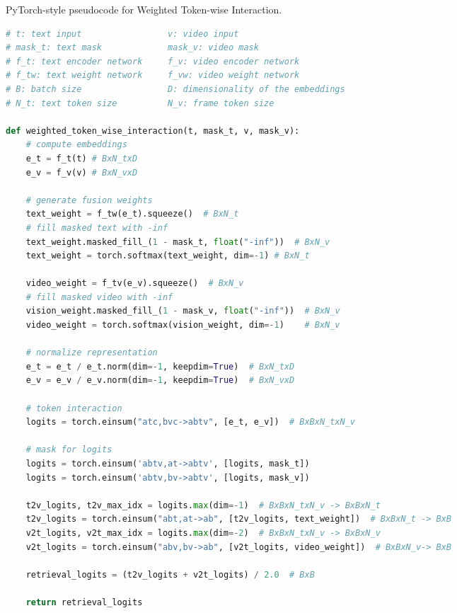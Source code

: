 \documentclass[runningheads]{llncs}
\begin{document}
\begin{algorithm}[tb]
\caption{PyTorch-style pseudocode for Weighted Token-wise Interaction.}
\label{alg:pytorchmask}
   
\begin{lstlisting}[language=python]
# t: text input                 v: video input
# mask_t: text mask             mask_v: video mask
# f_t: text encoder network     f_v: video encoder network
# f_tw: text weight network     f_vw: video weight network
# B: batch size                 D: dimensionality of the embeddings
# N_t: text token size          N_v: frame token size

def weighted_token_wise_interaction(t, mask_t, v, mask_v):    
    # compute embeddings
    e_t = f_t(t) # BxN_txD
    e_v = f_v(v) # BxN_vxD
    
    # generate fusion weights
    text_weight = f_tw(e_t).squeeze()  # BxN_t
    # fill masked text with -inf
    text_weight.masked_fill_(1 - mask_t, float("-inf"))  # BxN_v
    text_weight = torch.softmax(text_weight, dim=-1) # BxN_t
    
    video_weight = f_tv(e_v).squeeze()  # BxN_v
    # fill masked video with -inf
    vision_weight.masked_fill_(1 - mask_v, float("-inf"))  # BxN_v
    video_weight = torch.softmax(vision_weight, dim=-1)    # BxN_v
    
    # normalize representation
    e_t = e_t / e_t.norm(dim=-1, keepdim=True)  # BxN_txD
    e_v = e_v / e_v.norm(dim=-1, keepdim=True)  # BxN_vxD
    
    # token interaction
    logits = torch.einsum("atc,bvc->abtv", [e_t, e_v])  # BxBxN_txN_v

    # mask for logits
    logits = torch.einsum('abtv,at->abtv', [logits, mask_t])
    logits = torch.einsum('abtv,bv->abtv', [logits, mask_v])    
    
    t2v_logits, t2v_max_idx = logits.max(dim=-1)  # BxBxN_txN_v -> BxBxN_t
    t2v_logits = torch.einsum("abt,at->ab", [t2v_logits, text_weight])  # BxBxN_t -> BxB
    v2t_logits, v2t_max_idx = logits.max(dim=-2)  # BxBxN_txN_v -> BxBxN_v
    v2t_logits = torch.einsum("abv,bv->ab", [v2t_logits, video_weight])  # BxBxN_v-> BxB
    
    retrieval_logits = (t2v_logits + v2t_logits) / 2.0  # BxB
    
    return retrieval_logits
\end{lstlisting}
\end{algorithm}
\end{document}
